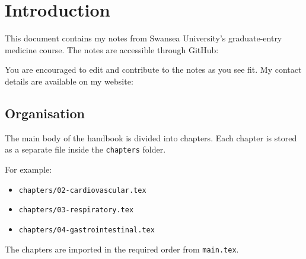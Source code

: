 \chapter{Introduction}

This document contains my notes from Swansea University's graduate-entry
medicine course. The notes are accessible through GitHub:


You are encouraged to edit and contribute to the notes as you see fit.
My contact details are available on my website:


\section{Organisation}

The main body of the handbook is divided into chapters. Each chapter is
stored as a separate file inside the \texttt{chapters} folder.

For example:

\begin{itemize}
    \item \texttt{chapters/02-cardiovascular.tex}
    \item \texttt{chapters/03-respiratory.tex}
    \item \texttt{chapters/04-gastrointestinal.tex}
\end{itemize}

The chapters are imported in the required order from
\texttt{main.tex}.
